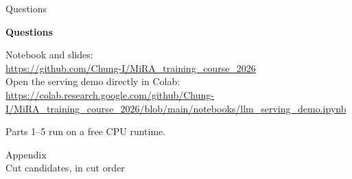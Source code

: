 \documentclass[aspectratio=169,10pt]{beamer}
\begin{document}
\begin{frame}[fragile]{Questions}
  \vspace{0.6em}
  \begin{center}
    {\Large\bfseries Questions}
  \end{center}
  \vspace{1.2em}
  \begin{center}\small
    Notebook and slides:\\[0.3em]
    \url{https://github.com/Chung-I/MiRA_training_course_2026}\\[0.8em]
    Open the serving demo directly in Colab:\\[0.3em]
    {\scriptsize\url{https://colab.research.google.com/github/Chung-I/MiRA_training_course_2026/blob/main/notebooks/llm_serving_demo.ipynb}}
  \end{center}
  \vspace{0.8em}
  \begin{center}\footnotesize
    Parts 1--5 run on a free CPU runtime.
  \end{center}
\end{frame}

\appendix

\begin{frame}[standout]
  Appendix\\[0.4em]
  {\normalsize Cut candidates, in cut order}
\end{frame}
\end{document}
